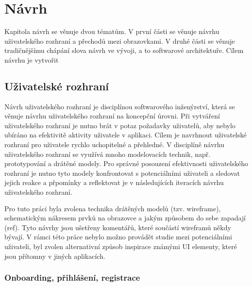 
\chapter{Návrh}

Kapitola návrh se věnuje dvou tématům. V první části se věnuje návrhu uživatelského rozhraní a přechodů mezi obrazovkami. V druhé části se věnuje tradičnějšímu chápání slova návrh ve vývoji, a to softwarové architektuře. Cílem návrhu je vytvořit 

\section{Uživatelské rozhraní}

Návrh uživatelského rozhraní je disciplínou softwarového inženýrství, která se věnuje návrhu uživatelského rozhraní na koncepční úrovni. Při vytváření uživatelského rozhraní je nutno brát v potaz požadavky uživatelů, aby nebylo ubíráno na efektivitě aktivity uživatele v aplikaci. Cílem je navrhnout uživatelské rozhraní pro uživatele rychlo uchopitelné a přehledné. V disciplíně návrhu uživatelského rozhraní se využívá mnoho modelovacích technik, např. prototypování a drátěné modely. Pro správné posouzení efektivnosti uživatelského rozhraní je nutno tyto modely konfrontovat s potenciálními uživateli a sledovat jejich reakce a přpomínky a reflektovat je v následujících iteracích návrhu uživatelského rozhraní. 

Pro tuto práci byla zvolena technika drátěných modelů (tzv. wireframe), schematickým nákresem prvků na obrazovce a jakým způsobem do sebe zapadají (ref). Tyto návrhy jsou ušetřeny komentářů, které součástí wireframů někdy bývají. V rámci této práce nebylo možno provádět studie mezi potenciálními uživateli, byl zvolen alternativní způsob inspirace známými UI elementy, které jsou přítomny v jiných aplikacích. 


\subsection{Onboarding, přihlášení, registrace}

